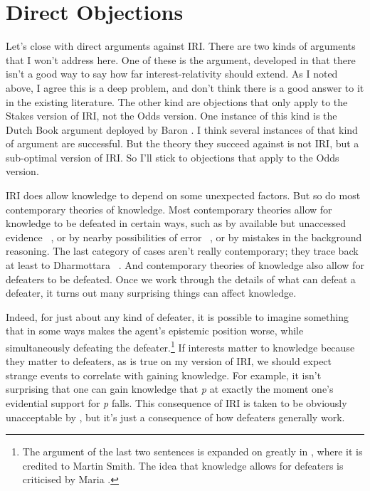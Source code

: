 \documentclass[11pt,oneside]{book}
\begin{document}
\section{Direct Objections}
\label{directobjections}

Let's close with direct arguments against IRI. There are two kinds of arguments that I won't address here. One of these is the argument, developed in  \citet{IchikawaEtAl2012} that there isn't a good way to say how far interest-relativity should extend. As I noted above, I agree this is a deep problem, and don't think there is a good answer to it in the existing literature. The other kind are objections that only apply to the Stakes version of IRI, not the Odds version. One instance of this kind is the Dutch Book argument deployed by Baron  \citet{Reed2014}. I think several instances of that kind of argument are successful. But the theory they succeed against is not IRI, but a sub-optimal version of IRI. So I'll stick to objections that apply to the Odds version.

IRI does allow knowledge to depend on some unexpected factors. But so do most contemporary theories of knowledge. Most contemporary theories allow for knowledge to be defeated in certain ways, such as by available but unaccessed evidence ~\citep[75]{Harman1973}, or by nearby possibilities of error ~\citep{Goldman1976}, or by mistakes in the background reasoning. The last category of cases aren't really contemporary; they trace back at least to Dharmottara ~\citep[58]{Nagel2014}. And contemporary theories of knowledge also allow for defeaters to be defeated. Once we work through the details of what can defeat a defeater, it turns out many surprising things can affect knowledge.

Indeed, for just about any kind of defeater, it is possible to imagine something that in some ways makes the agent's epistemic position worse, while simultaneously defeating the defeater.\footnote{The argument of the last two sentences is expanded on greatly in  \citet[§3]{Weatherson2014-ProbScept}, where it is credited to Martin Smith. The idea that knowledge allows for defeaters is criticised by Maria  \citet{Lasonen-Aarnio2014}.} If interests matter to knowledge because they matter to defeaters, as is true on my version of IRI, we should expect strange events to correlate with gaining knowledge. For example, it isn't surprising that one can gain knowledge that \emph{p} at exactly the moment one's evidential support for \emph{p} falls. This consequence of IRI is taken to be obviously unacceptable by  \citet{EatonPickavance2015}, but it's just a consequence of how defeaters generally work.
\end{document}
